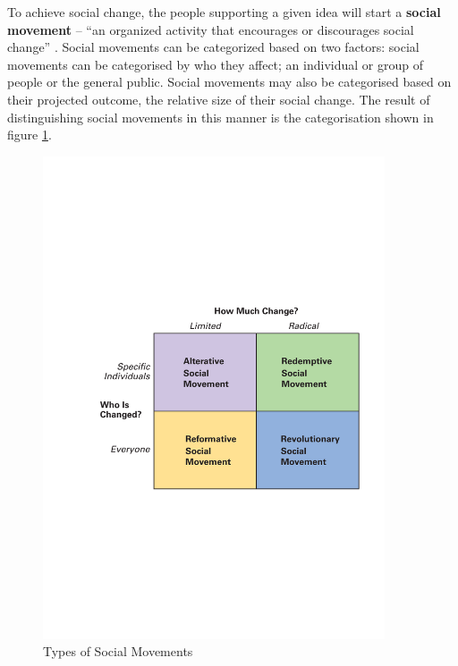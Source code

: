 To achieve social change, the people supporting a given idea will start a \textbf{social movement} -- ``an organized activity that encourages or discourages social change'' \citep[pg. 548]{Macionis12}. Social movements can be categorized based on two factors: social movements can be categorised by who they affect; an individual or group of people or the general public. Social movements may also be categorised based on their projected outcome, the relative size of their social change. The result of distinguishing social movements in this manner is the categorisation shown in figure \ref{fig:socmovements}.\par\vspace{0.2cm}
	\begin{figure}[ht]
    	\includegraphics[width=0.9\textwidth]{assets/4_Types_of_SocMovements.pdf}
    	\caption{Types of Social Movements \citep[pg. 549]{Macionis12}
    	\label{fig:socmovements}}
	\end{figure}

